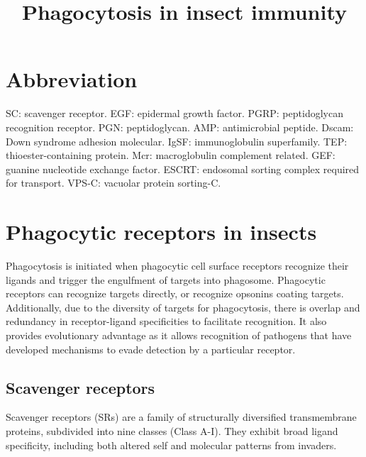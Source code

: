 \documentclass[11pt]{article}
\title{Phagocytosis in insect immunity}
\author{}
\date{}
\begin{document}
  \maketitle

  \linenumbers
\section{Abbreviation}
SC: scavenger receptor.\newline
EGF: epidermal growth factor.\newline
PGRP: peptidoglycan recognition receptor.\newline
PGN: peptidoglycan.\newline
AMP: antimicrobial peptide.\newline
Dscam: Down syndrome adhesion molecular.\newline
IgSF: immunoglobulin superfamily.\newline
TEP: thioester-containing protein.\newline
Mcr: macroglobulin complement related.\newline
GEF: guanine nucleotide exchange factor.\newline
ESCRT: endosomal sorting complex required for transport.\newline 
VPS-C: vacuolar protein sorting-C.\newline


\section{Phagocytic receptors in insects}
Phagocytosis is initiated when phagocytic cell surface receptors recognize their ligands and trigger the engulfment of targets into phagosome. 
Phagocytic receptors can recognize targets directly, or recognize opsonins coating targets. 
Additionally, due to the diversity of targets for phagocytosis, there is overlap and redundancy in receptor-ligand specificities to facilitate recognition. 
It also provides evolutionary advantage as it allows recognition of pathogens that have developed mechanisms to evade detection by a particular receptor. 

\subsection{Scavenger receptors}
Scavenger receptors (SRs) are a family of structurally diversified transmembrane proteins, subdivided into nine classes (Class A-I). 
They exhibit broad ligand specificity, including both altered self and molecular patterns from invaders. 
\end{document}
